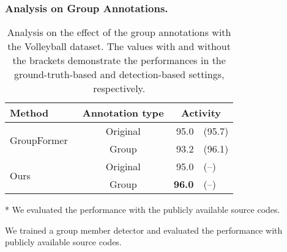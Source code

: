 \documentclass[runningheads]{llncs}
\begin{document}
\subsubsection{Analysis on Group Annotations.}
\begin{table}[t]
 \caption{Analysis on the effect of the group annotations with the Volleyball dataset. The values with and without the brackets demonstrate the performances in the ground-truth-based and detection-based settings, respectively.}
 \label{table:analysis_group_annos}
 \centering
 \setlength{\tabcolsep}{6pt}
 \begin{threeparttable}
  \begin{tabular}{@{}l@{\hskip 6em}c@{\hskip 7em}rl@{}}
   \toprule
   Method & Annotation type & \multicolumn{2}{c}{Activity} \\
   \midrule
   \multirow{2}{*}{GroupFormer~\cite{li_iccv2021}} & Original & 95.0\tnote{*} & (95.7) \\
   & Group & 93.2\tnote{\ddag} & (96.1\tnote{*}\hspace{0.4em}) \\
   \midrule
   \multirow{2}{*}{Ours} & Original & 95.0 & (\hspace{0.6em}--\hspace{0.6em}) \\
   & Group & \textbf{96.0} & (\hspace{0.6em}--\hspace{0.6em}) \\
   \bottomrule
  \end{tabular}
  \begin{tablenotes}\footnotesize
    \item[*] We evaluated the performance with the publicly available source codes.
    \item[\ddag] We trained a group member detector and evaluated the performance with publicly available source codes.
  \end{tablenotes}
 \end{threeparttable}
 \vspace{-1.0em}
\end{table}
\end{document}
